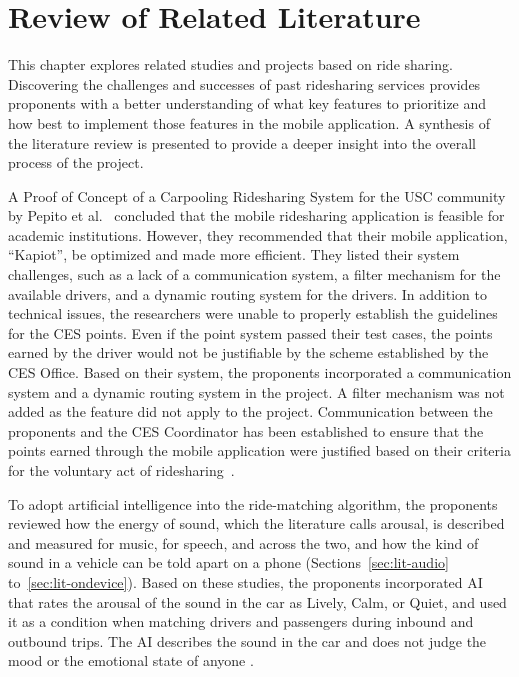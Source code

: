 \chapter{Review of Related Literature}
This chapter explores related studies and projects based on ride sharing. Discovering the challenges and successes of past ridesharing services provides proponents with a better understanding of what key features to prioritize and how best to implement those features in the mobile application. A synthesis of the literature review is presented to provide a deeper insight into the overall process of the project.

A Proof of Concept of a Carpooling Ridesharing System for the USC community by Pepito et al.~\cite{pepito2022} concluded that the mobile ridesharing application is feasible for academic institutions. However, they recommended that their mobile application, “Kapiot”, be optimized and made more efficient. They listed their system challenges, such as a lack of a communication system, a filter mechanism for the available drivers, and a dynamic routing system for the drivers. In addition to technical issues, the researchers were unable to properly establish the guidelines for the CES points. Even if the point system passed their test cases, the points earned by the driver would not be justifiable by the scheme established by the CES Office. Based on their system, the proponents incorporated a communication system and a dynamic routing system in the project. A filter mechanism was not added as the feature did not apply to the project. Communication between the proponents and the CES Coordinator has been established to ensure that the points earned through the mobile application were justified based on their criteria for the voluntary act of ridesharing~\cite{pepito2022}.

To adopt artificial intelligence into the ride-matching algorithm, the proponents reviewed how the energy of sound, which the literature calls arousal, is described and measured for music, for speech, and across the two, and how the kind of sound in a vehicle can be told apart on a phone (Sections~\ref{sec:lit-audio} to~\ref{sec:lit-ondevice}). Based on these studies, the proponents incorporated AI that rates the arousal of the sound in the car as Lively, Calm, or Quiet, and used it as a condition when matching drivers and passengers during inbound and outbound trips. The AI describes the sound in the car and does not judge the mood or the emotional state of anyone \cite{zhang2026generalisation,won2017adaptive}.

